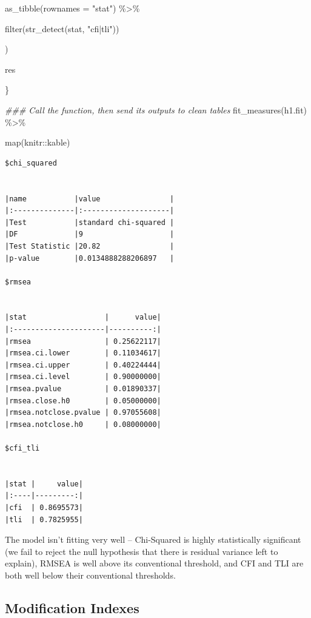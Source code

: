 \documentclass[
  letterpaper,
  DIV=11,
  numbers=noendperiod]{scrreprt}
\newenvironment{Shaded}{\begin{snugshade}}{\end{snugshade}}
\newcommand{\AttributeTok}[1]{\textcolor[rgb]{0.40,0.45,0.13}{#1}}
\newcommand{\DocumentationTok}[1]{\textcolor[rgb]{0.37,0.37,0.37}{\textit{#1}}}
\newcommand{\FunctionTok}[1]{\textcolor[rgb]{0.28,0.35,0.67}{#1}}
\newcommand{\NormalTok}[1]{\textcolor[rgb]{0.00,0.23,0.31}{#1}}
\newcommand{\SpecialCharTok}[1]{\textcolor[rgb]{0.37,0.37,0.37}{#1}}
\newcommand{\StringTok}[1]{\textcolor[rgb]{0.13,0.47,0.30}{#1}}
\begin{document}
\begin{Shaded}
\begin{Highlighting}[]
      \FunctionTok{as\_tibble}\NormalTok{(}\AttributeTok{rownames =} \StringTok{"stat"}\NormalTok{) }\SpecialCharTok{\%\textgreater{}\%} 
      
      \FunctionTok{filter}\NormalTok{(}\FunctionTok{str\_detect}\NormalTok{(stat, }\StringTok{"cfi|tli"}\NormalTok{)) }
    
\NormalTok{  )}
  
\NormalTok{  res}
  
\NormalTok{\}}

\DocumentationTok{\#\#\# Call the function, then send its outputs to clean tables}
\FunctionTok{fit\_measures}\NormalTok{(h1.fit) }\SpecialCharTok{\%\textgreater{}\%} 
  
  \FunctionTok{map}\NormalTok{(knitr}\SpecialCharTok{::}\NormalTok{kable)}
\end{Highlighting}
\end{Shaded}

\begin{verbatim}
$chi_squared


|name           |value                |
|:--------------|:--------------------|
|Test           |standard chi-squared |
|DF             |9                    |
|Test Statistic |20.82                |
|p-value        |0.0134888288206897   |

$rmsea


|stat                  |      value|
|:---------------------|----------:|
|rmsea                 | 0.25622117|
|rmsea.ci.lower        | 0.11034617|
|rmsea.ci.upper        | 0.40224444|
|rmsea.ci.level        | 0.90000000|
|rmsea.pvalue          | 0.01890337|
|rmsea.close.h0        | 0.05000000|
|rmsea.notclose.pvalue | 0.97055608|
|rmsea.notclose.h0     | 0.08000000|

$cfi_tli


|stat |     value|
|:----|---------:|
|cfi  | 0.8695573|
|tli  | 0.7825955|
\end{verbatim}

The model isn't fitting very well -- Chi-Squared is highly statistically
significant (we fail to reject the null hypothesis that there is
residual variance left to explain), RMSEA is well above its conventional
threshold, and CFI and TLI are both well below their conventional
thresholds.

\hypertarget{modification-indexes-1}{%
\subsection*{Modification Indexes}\label{modification-indexes-1}}
\end{document}
